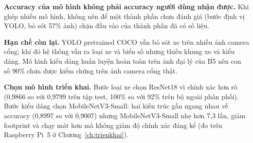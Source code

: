 \textbf{Accuracy của mô hình không phải accuracy người dùng nhận được.} Khi ghép nhiều mô
hình, không nên để một thành phần chưa đánh giá (bước định vị YOLO, bỏ sót 57\% ảnh) chặn
đầu vào của thành phần đã có số liệu.

\textbf{Hạn chế còn lại.} YOLO pretrained COCO vẫn bỏ sót xe trên nhiều ảnh camera cổng; khi
đó hệ thống vẫn ra loại xe và biển số nhưng thiếu khung xe và kiểu dáng. Mô hình kiểu dáng
huấn luyện hoàn toàn trên ảnh đại lý của B5 nên con số 90\% chưa được kiểm chứng trên ảnh
camera cổng thật.

\textbf{Chọn mô hình triển khai.} Bước loại xe chọn ResNet18 vì chính xác hơn rõ (0,9866 so
với 0,9799 trên tập test, 100\% so với 92\% trên bộ ngoài phân phối). Bước kiểu dáng chọn
MobileNetV3-Small: hai kiến trúc gần ngang nhau về accuracy (0,8997 so với 0,9007) nhưng
MobileNetV3-Small nhẹ hơn 7,3 lần, giảm footprint và chạy mát hơn mà không giảm độ chính xác
đáng kể (đo trên Raspberry Pi~5 ở Chương~\ref{ch:trienkhai}).
